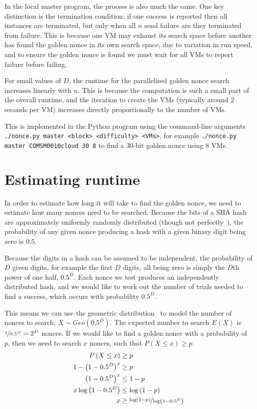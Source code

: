 \documentclass[letterpaper,twocolumn,11pt]{article}
\begin{document}
In the local master program, the process is also much the same. One key distinction is the termination condition: if one success is reported then all instances are terminated, but only when all $n$ send failure are they terminated from failure. This is because one VM may exhaust its search space before another has found the golden nonce in its own search space, due to variation in run speed, and to ensure the golden nonce is found we must wait for all VMs to report failure before failing.

For small values of $D$, the runtime for the parallelised golden nonce search increases linearly with $n$. This is because the computation is such a small part of the overall runtime, and the iteration to create the VMs (typically around 2 seconds per VM) increases directly proportionally to the number of VMs.

This is implemented in the Python program using the command-line arguments \texttt{./nonce.py master <block> <difficulty> <VMs>}, for example \verb|./nonce.py master COMSM0010cloud 30 8| to find a 30-bit golden nonce using 8 VMs.

\section{Estimating runtime}

In order to estimate how long it will take to find the golden nonce, we need to estimate how many nonces need to be searched. Because the bits of a SHA hash are approximately uniformly randomly distributed (though not perfectly~\cite{cryptoeprint:2008:441}), the probability of any given nonce producing a hash with a given binary digit being zero is $0.5$.

Because the digits in a hash can be assumed to be independent, the probability of $D$ given digits, for example the first $D$ digits, all being zero is simply the $D$th power of one half, $0.5^D$. Each nonce we test produces an independently distributed hash, and we would like to work out the number of trials needed to find a success, which occurs with probability $0.5^D$.

This means we can use the geometric distribution~\cite{geometric} to model the number of nonces to search, $X \sim Geo\left(0.5^D\right)$. The expected number to search $E\left(X\right)$ is $\nicefrac{1}{0.5^D} = 2^D$ nonces. If we would like to find a golden nonce with a probability of $p$, then we need to search $x$ nonces, such that $P\left(X\leq x\right) \geq p$.
\begin{align*}
    P\left(X\leq x\right) &\geq p \\
    1-\left(1-0.5^D\right)^x &\geq p \\
    \left(1-0.5^D\right)^x &\leq 1-p \\
    x\log\left(1-0.5^D\right) &\leq \log\left(1-p\right) \\
    x &\geq \nicefrac{\log\left(1-p\right)}{\log\left(1-0.5^D\right)} \\
\end{align*}
\end{document}
